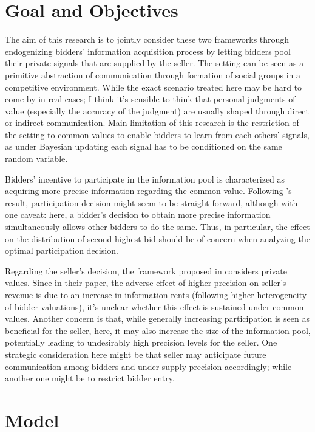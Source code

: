 \section*{Goal and Objectives}

The aim of this research is to jointly consider these two frameworks through endogenizing bidders' information acquisition process by letting bidders pool their private signals that are supplied by the seller. The setting can be seen as a primitive abstraction of communication through formation of social groups in a competitive environment. While the exact scenario treated here may be hard to come by in real cases; I think it's sensible to think that personal judgments of value (especially the accuracy of the judgment) are usually shaped through direct or indirect communication. Main limitation of this research is the restriction of the setting to common values to enable bidders to learn from each others' signals, as under Bayesian updating each signal has to be conditioned on the same random variable.

Bidders' incentive to participate in the information pool is characterized as acquiring more precise information regarding the common value. Following \cite{persico2000information}'s result, participation decision might seem to be straight-forward, although with one caveat: here, a bidder's decision to obtain more precise information simultaneously allows other bidders to do the same. Thus, in particular, the effect on the distribution of second-highest bid should be of concern when analyzing the optimal participation decision. 

Regarding the seller's decision, the framework proposed in \cite{ganuza2010signal} considers private values. Since in their paper, the adverse effect of higher precision on seller's revenue is due to an increase in information rents (following higher heterogeneity of bidder valuations), it's unclear whether this effect is sustained under common values. Another concern is that, while generally increasing participation is seen as beneficial for the seller, here, it may also increase the size of the information pool, potentially leading to undesirably high precision levels for the seller. One strategic consideration here might be that seller may anticipate future communication among bidders and under-supply precision accordingly; while another one might be to restrict bidder entry.

\section*{Model}
